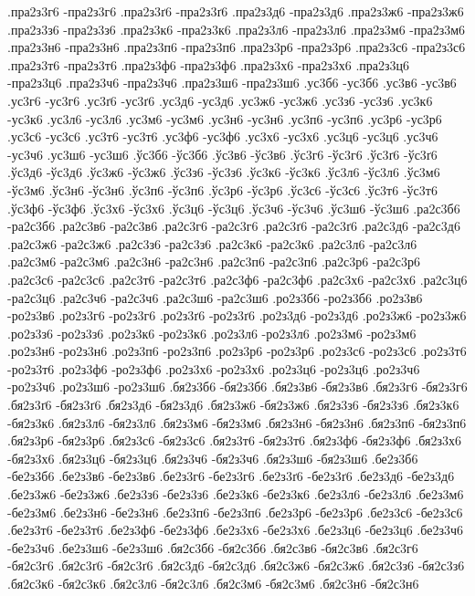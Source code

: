 {.пра2з3г6 -пра2з3г6
.пра2з3ґ6 -пра2з3ґ6
.пра2з3д6 -пра2з3д6
.пра2з3ж6 -пра2з3ж6
.пра2з3з6 -пра2з3з6
.пра2з3к6 -пра2з3к6
.пра2з3л6 -пра2з3л6
.пра2з3м6 -пра2з3м6
.пра2з3н6 -пра2з3н6
.пра2з3п6 -пра2з3п6
.пра2з3р6 -пра2з3р6
.пра2з3с6 -пра2з3с6
.пра2з3т6 -пра2з3т6
.пра2з3ф6 -пра2з3ф6
.пра2з3х6 -пра2з3х6
.пра2з3ц6 -пра2з3ц6
.пра2з3ч6 -пра2з3ч6
.пра2з3ш6 -пра2з3ш6
.ус3б6 -ус3б6
.ус3в6 -ус3в6
.ус3г6 -ус3г6
.ус3ґ6 -ус3ґ6
.ус3д6 -ус3д6
.ус3ж6 -ус3ж6
.ус3з6 -ус3з6
.ус3к6 -ус3к6
.ус3л6 -ус3л6
.ус3м6 -ус3м6
.ус3н6 -ус3н6
.ус3п6 -ус3п6
.ус3р6 -ус3р6
.ус3с6 -ус3с6
.ус3т6 -ус3т6
.ус3ф6 -ус3ф6
.ус3х6 -ус3х6
.ус3ц6 -ус3ц6
.ус3ч6 -ус3ч6
.ус3ш6 -ус3ш6
.ўс3б6 -ўс3б6
.ўс3в6 -ўс3в6
.ўс3г6 -ўс3г6
.ўс3ґ6 -ўс3ґ6
.ўс3д6 -ўс3д6
.ўс3ж6 -ўс3ж6
.ўс3з6 -ўс3з6
.ўс3к6 -ўс3к6
.ўс3л6 -ўс3л6
.ўс3м6 -ўс3м6
.ўс3н6 -ўс3н6
.ўс3п6 -ўс3п6
.ўс3р6 -ўс3р6
.ўс3с6 -ўс3с6
.ўс3т6 -ўс3т6
.ўс3ф6 -ўс3ф6
.ўс3х6 -ўс3х6
.ўс3ц6 -ўс3ц6
.ўс3ч6 -ўс3ч6
.ўс3ш6 -ўс3ш6
.ра2с3б6 -ра2с3б6
.ра2с3в6 -ра2с3в6
.ра2с3г6 -ра2с3г6
.ра2с3ґ6 -ра2с3ґ6
.ра2с3д6 -ра2с3д6
.ра2с3ж6 -ра2с3ж6
.ра2с3з6 -ра2с3з6
.ра2с3к6 -ра2с3к6
.ра2с3л6 -ра2с3л6
.ра2с3м6 -ра2с3м6
.ра2с3н6 -ра2с3н6
.ра2с3п6 -ра2с3п6
.ра2с3р6 -ра2с3р6
.ра2с3с6 -ра2с3с6
.ра2с3т6 -ра2с3т6
.ра2с3ф6 -ра2с3ф6
.ра2с3х6 -ра2с3х6
.ра2с3ц6 -ра2с3ц6
.ра2с3ч6 -ра2с3ч6
.ра2с3ш6 -ра2с3ш6
.ро2з3б6 -ро2з3б6
.ро2з3в6 -ро2з3в6
.ро2з3г6 -ро2з3г6
.ро2з3ґ6 -ро2з3ґ6
.ро2з3д6 -ро2з3д6
.ро2з3ж6 -ро2з3ж6
.ро2з3з6 -ро2з3з6
.ро2з3к6 -ро2з3к6
.ро2з3л6 -ро2з3л6
.ро2з3м6 -ро2з3м6
.ро2з3н6 -ро2з3н6
.ро2з3п6 -ро2з3п6
.ро2з3р6 -ро2з3р6
.ро2з3с6 -ро2з3с6
.ро2з3т6 -ро2з3т6
.ро2з3ф6 -ро2з3ф6
.ро2з3х6 -ро2з3х6
.ро2з3ц6 -ро2з3ц6
.ро2з3ч6 -ро2з3ч6
.ро2з3ш6 -ро2з3ш6
.бя2з3б6 -бя2з3б6
.бя2з3в6 -бя2з3в6
.бя2з3г6 -бя2з3г6
.бя2з3ґ6 -бя2з3ґ6
.бя2з3д6 -бя2з3д6
.бя2з3ж6 -бя2з3ж6
.бя2з3з6 -бя2з3з6
.бя2з3к6 -бя2з3к6
.бя2з3л6 -бя2з3л6
.бя2з3м6 -бя2з3м6
.бя2з3н6 -бя2з3н6
.бя2з3п6 -бя2з3п6
.бя2з3р6 -бя2з3р6
.бя2з3с6 -бя2з3с6
.бя2з3т6 -бя2з3т6
.бя2з3ф6 -бя2з3ф6
.бя2з3х6 -бя2з3х6
.бя2з3ц6 -бя2з3ц6
.бя2з3ч6 -бя2з3ч6
.бя2з3ш6 -бя2з3ш6
.бе2з3б6 -бе2з3б6
.бе2з3в6 -бе2з3в6
.бе2з3г6 -бе2з3г6
.бе2з3ґ6 -бе2з3ґ6
.бе2з3д6 -бе2з3д6
.бе2з3ж6 -бе2з3ж6
.бе2з3з6 -бе2з3з6
.бе2з3к6 -бе2з3к6
.бе2з3л6 -бе2з3л6
.бе2з3м6 -бе2з3м6
.бе2з3н6 -бе2з3н6
.бе2з3п6 -бе2з3п6
.бе2з3р6 -бе2з3р6
.бе2з3с6 -бе2з3с6
.бе2з3т6 -бе2з3т6
.бе2з3ф6 -бе2з3ф6
.бе2з3х6 -бе2з3х6
.бе2з3ц6 -бе2з3ц6
.бе2з3ч6 -бе2з3ч6
.бе2з3ш6 -бе2з3ш6
.бя2с3б6 -бя2с3б6
.бя2с3в6 -бя2с3в6
.бя2с3г6 -бя2с3г6
.бя2с3ґ6 -бя2с3ґ6
.бя2с3д6 -бя2с3д6
.бя2с3ж6 -бя2с3ж6
.бя2с3з6 -бя2с3з6
.бя2с3к6 -бя2с3к6
.бя2с3л6 -бя2с3л6
.бя2с3м6 -бя2с3м6
.бя2с3н6 -бя2с3н6
}
